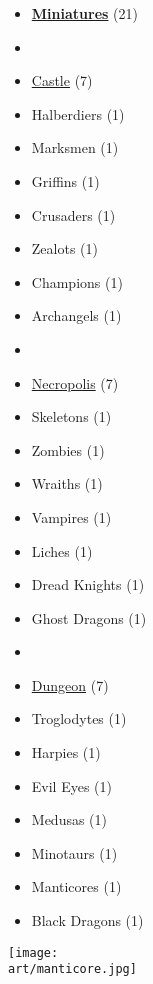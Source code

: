 
\begin{multicols*}{2}

\small

\begin{itemize}[leftmargin=0pt, label={}, noitemsep, noitemsep]
  \item \textbf{\underline{Miniatures}} (21)
  \item
  \item \underline{Castle} (7)
  \item Halberdiers (1)
  \item Marksmen (1)
  \item Griffins (1)
  \item Crusaders (1)
  \item Zealots (1)
  \item Champions (1)
  \item Archangels (1)
  \item
  \item \underline{Necropolis} (7)
  \item Skeletons (1)
  \item Zombies (1)
  \item Wraiths (1)
  \item Vampires (1)
  \item Liches (1)
  \item Dread Knights (1)
  \item Ghost Dragons (1)
  \item
  \item \underline{Dungeon} (7)
  \item Troglodytes (1)
  \item Harpies (1)
  \item Evil Eyes (1)
  \item Medusas (1)
  \item Minotaurs (1)
  \item Manticores (1)
  \item Black Dragons (1)
\end{itemize}

\columnbreak

\hspace{-2.5em}
\texttt{[image: \\art/manticore.jpg]}

\end{multicols*}
